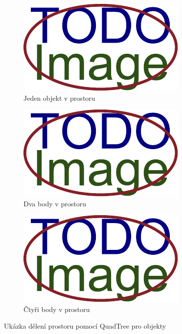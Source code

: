 
\begin{figure}[H]
	\centering
	\begin{subfigure}{0.32\textwidth}
		\includegraphics[width=\textwidth]{obrazky-figures/placeholder.pdf}
		\caption{Jeden objekt v prostoru}
		\label{fig:silnice:quadtree-obj:1}
	\end{subfigure}
	\hfill
	\begin{subfigure}{0.32\textwidth}
		\includegraphics[width=\textwidth]{obrazky-figures/placeholder.pdf}
		\caption{Dva body v prostoru}
		\label{fig:silnice:quadtree-obj:2}
	\end{subfigure}
	\hfill
	\begin{subfigure}{0.32\textwidth}
		\includegraphics[width=\textwidth]{obrazky-figures/placeholder.pdf}
		\caption{Čtyři body v prostoru}
		\label{fig:silnice:quadtree-obj:4}
	\end{subfigure}
	\caption{Ukázka dělení prostoru pomocí QuadTree pro objekty}
	\label{fig:silnice:quadtree-obj}
\end{figure}

